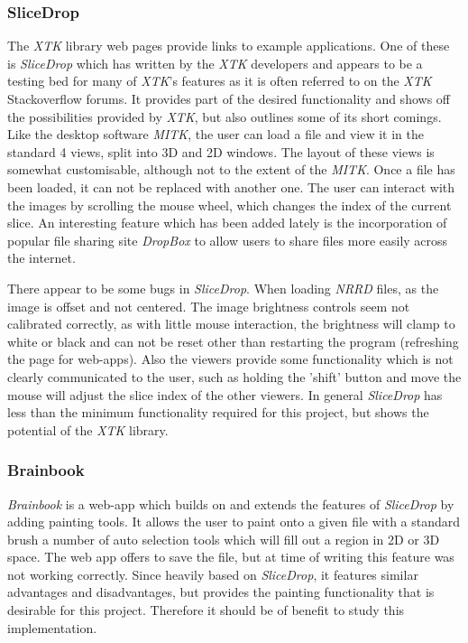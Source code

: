 \documentclass[a4paper,11pt,twoside]{article}
\begin{document}
\subsubsection{SliceDrop}
The \textit{XTK} library web pages provide links to example applications. One of these is \textit{SliceDrop}\cite{slicedrop} which has written by the \textit{XTK} developers and appears to be a testing bed for many of \textit{XTK}'s features as it is often referred to on the \textit{XTK} Stackoverflow forums. It provides part of the desired functionality and shows off the possibilities provided by \textit{XTK}, but also outlines some of its short comings. Like the desktop software \textit{MITK}, the user can load a file and view it in the standard 4 views, split into 3D and 2D windows. The layout of these views is somewhat customisable, although not to the extent of the \textit{MITK}. Once a file has been loaded, it can not be replaced with another one. The user can interact with the images by scrolling the mouse wheel, which changes the index of the current slice. An interesting feature which has been added lately is the incorporation of popular file sharing site \textit{DropBox} to allow users to share files more easily across the internet.

There appear to be some bugs in \textit{SliceDrop}. When loading \textit{NRRD} files, as the image is offset and not centered. The image brightness controls seem not calibrated correctly, as with little mouse interaction, the brightness will clamp to white or black and can not be reset other than restarting the program (refreshing the page for web-apps). Also the viewers provide some functionality which is not clearly communicated to the user, such as holding the 'shift' button and move the mouse will adjust the slice index of the other viewers. In general \textit{SliceDrop} has less than the minimum functionality required for this project, but shows the potential of the \textit{XTK} library. 


\subsubsection{Brainbook}
\textit{Brainbook}\cite{brainbook} is a web-app which builds on and extends the features of \textit{SliceDrop} by adding painting tools. It allows the user to paint onto a given file with a standard brush a number of auto selection tools which will fill out a region in 2D or 3D space. The web app offers to save the file, but at time of writing this feature was not working correctly. Since heavily based on \textit{SliceDrop}, it features similar advantages and disadvantages, but provides the painting functionality that is desirable for this project. Therefore it should be of benefit to study this implementation.
\end{document}
